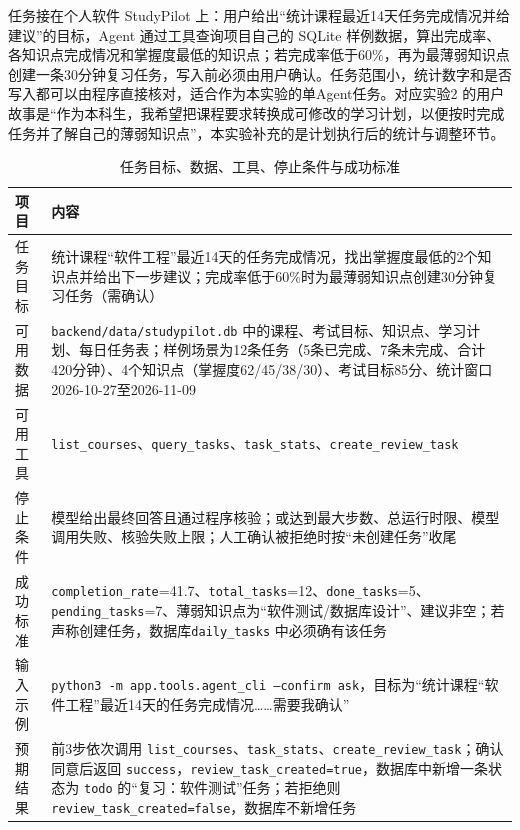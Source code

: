 \documentclass[UTF8,12pt,a4paper]{ctexart}
\begin{document}
任务接在个人软件 StudyPilot 上：用户给出“统计课程最近14天任务完成情况并给建议”的目标，Agent 通过工具查询项目自己的 SQLite 样例数据，算出完成率、各知识点完成情况和掌握度最低的知识点；若完成率低于60\%，再为最薄弱知识点创建一条30分钟复习任务，写入前必须由用户确认。任务范围小，统计数字和是否写入都可以由程序直接核对，适合作为本实验的单Agent任务。对应实验2 的用户故事是“作为本科生，我希望把课程要求转换成可修改的学习计划，以便按时完成任务并了解自己的薄弱知识点”，本实验补充的是计划执行后的统计与调整环节。

\begin{table}[H]
\centering
\caption{任务目标、数据、工具、停止条件与成功标准}
\label{tab:task}
\small
\begin{tabularx}{\textwidth}{p{2.6cm}X}
\toprule
项目 & 内容 \\
\midrule
任务目标 & 统计课程“软件工程”最近14天的任务完成情况，找出掌握度最低的2个知识点并给出下一步建议；完成率低于60\%时为最薄弱知识点创建30分钟复习任务（需确认） \\
可用数据 & \texttt{backend/data/studypilot.db} 中的课程、考试目标、知识点、学习计划、每日任务表；样例场景为12条任务（5条已完成、7条未完成、合计420分钟）、4个知识点（掌握度62/45/38/30）、考试目标85分、统计窗口2026-10-27至2026-11-09 \\
可用工具 & \texttt{list\_courses}、\texttt{query\_tasks}、\texttt{task\_stats}、\texttt{create\_review\_task} \\
停止条件 & 模型给出最终回答且通过程序核验；或达到最大步数、总运行时限、模型调用失败、核验失败上限；人工确认被拒绝时按“未创建任务”收尾 \\
成功标准 & \texttt{completion\_rate}=41.7、\texttt{total\_tasks}=12、\texttt{done\_tasks}=5、\texttt{pending\_tasks}=7、薄弱知识点为“软件测试/数据库设计”、建议非空；若声称创建任务，数据库\newline \texttt{daily\_tasks} 中必须确有该任务 \\
输入示例 & \texttt{python3 -m app.tools.agent\_cli --confirm ask}，目标为“统计课程“软件工程”最近14天的任务完成情况……需要我确认” \\
预期结果 & 前3步依次调用 \texttt{list\_courses}、\texttt{task\_stats}、\texttt{create\_review\_task}；确认同意后返回 \texttt{success}，\texttt{review\_task\_created=true}，数据库中新增一条状态为 \texttt{todo} 的“复习：软件测试”任务；若拒绝则 \texttt{review\_task\_created=false}，数据库不新增任务 \\
\bottomrule
\end{tabularx}
\end{table}
\end{document}
